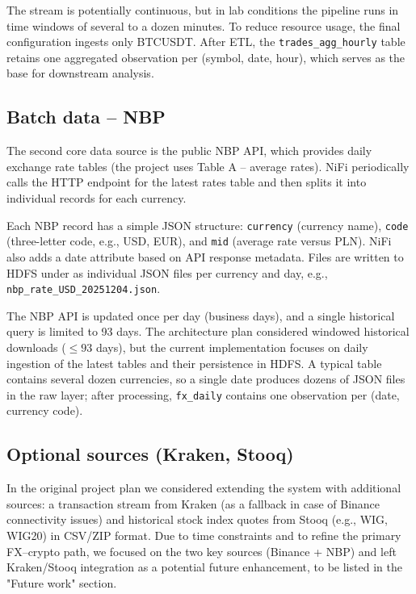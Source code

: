 \documentclass{article}
\begin{document}
The stream is potentially continuous, but in lab conditions the pipeline
runs in time windows of several to a dozen minutes. To reduce resource
usage, the final configuration ingests only BTCUSDT. After ETL, the
\texttt{trades\_agg\_hourly} table retains one aggregated observation per
(symbol, date, hour), which serves as the base for downstream analysis.

\subsection{Batch data -- NBP}

The second core data source is the public NBP API, which provides daily
exchange rate tables (the project uses Table A -- average rates). NiFi
periodically calls the HTTP endpoint for the latest rates table and then
splits it into individual records for each currency.

Each NBP record has a simple JSON structure: \texttt{currency} (currency
name), \texttt{code} (three-letter code, e.g., USD, EUR), and
\texttt{mid} (average rate versus PLN). NiFi also adds a date attribute
based on API response metadata. Files are written to HDFS under
 as individual JSON files
per currency and day, e.g., \texttt{nbp\_rate\_USD\_20251204.json}.

The NBP API is updated once per day (business days), and a single
historical query is limited to 93 days. The architecture plan considered
windowed historical downloads (\(\le 93\) days), but the current
implementation focuses on daily ingestion of the latest tables and their
persistence in HDFS. A typical table contains several dozen currencies,
so a single date produces dozens of JSON files in the raw layer; after
processing, \texttt{fx\_daily} contains one observation per (date,
currency code).

\subsection{Optional sources (Kraken, Stooq)}

In the original project plan we considered extending the system with
additional sources: a transaction stream from Kraken (as a fallback in
case of Binance connectivity issues) and historical stock index quotes
from Stooq (e.g., WIG, WIG20) in CSV/ZIP format. Due to time constraints
and to refine the primary FX--crypto path, we focused on the two key
sources (Binance + NBP) and left Kraken/Stooq integration as a potential
future enhancement, to be listed in the "Future work" section.
\end{document}
